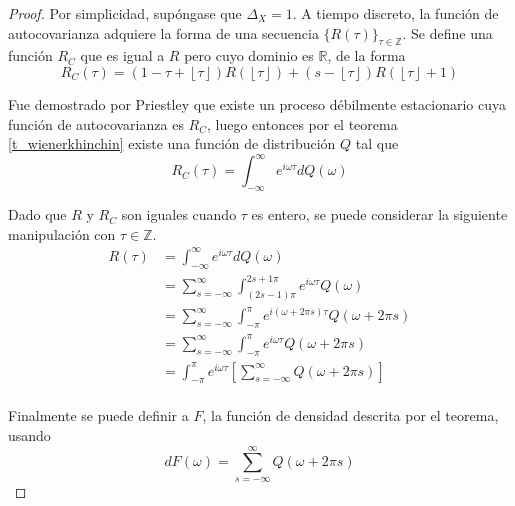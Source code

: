 \documentclass[12pt,letterpaper]{book}
\newcommand{\R}{\mathbb{R}}
\newcommand{\Z}{\mathbb{Z}}
\newcommand{\intR}{\int_{-\infty}^{\infty}}
\newcommand{\intPI}{\int_{-\pi}^{\pi}}
\newcommand{\entero}[1]{\left\lfloor #1 \right\rfloor}
\begin{document}
\begin{proof}
Por simplicidad, supóngase que $\Delta_X=1$. A tiempo discreto, la función de autocovarianza adquiere la forma de una secuencia $\{R(\tau)\}_{\tau\in \Z}$. Se define una función $R_C$ que es igual a $R$ pero cuyo dominio es $\R$, de la forma
\begin{equation}
R_C(\tau) = \left( 1 - \tau + \entero{\tau} \right) R\left( \entero{\tau} \right) +
\left( s - \entero{\tau} \right) R\left( \entero{\tau} +1 \right)
\end{equation}

Fue demostrado por Priestley \cite{Priestley81} que existe un proceso débilmente estacionario cuya función de autocovarianza es $R_C$, luego entonces por el teorema \ref{t_wienerkhinchin} existe una función de distribución $Q$ tal que 
\begin{equation}
R_C(\tau) = \intR e^{i \omega \tau} dQ(\omega)
\end{equation}

Dado que $R$ y $R_C$ son iguales cuando $\tau$ es entero, se puede considerar la siguiente manipulación con $\tau \in \Z$.
\begingroup
\allowdisplaybreaks
\begin{align*}
R(\tau) &= 
\intR e^{i \omega \tau} dQ(\omega) \\
&=
\sum_{s = -\infty}^{\infty} \int_{(2s-1)\pi}^{2s+1 \pi} e^{i \omega \tau} Q(\omega) \\
&=
\sum_{s = -\infty}^{\infty} \int_{-\pi}^{\pi} e^{i \left(\omega + 2\pi s \right) \tau} Q(\omega + 2 \pi s) \\
&=
\sum_{s = -\infty}^{\infty} \int_{-\pi}^{\pi} e^{i \omega \tau} Q(\omega + 2 \pi s) \\
&=
\int_{-\pi}^{\pi} e^{i \omega \tau} \left[ \sum_{s = -\infty}^{\infty} Q(\omega + 2 \pi s) \right] \\
\end{align*}
\endgroup

Finalmente se puede definir a $F$, la función de densidad descrita por el teorema, usando
\begin{equation}
dF(\omega) = \sum_{s = -\infty}^{\infty} Q(\omega + 2 \pi s)
\end{equation}

\end{proof}
\end{document}
